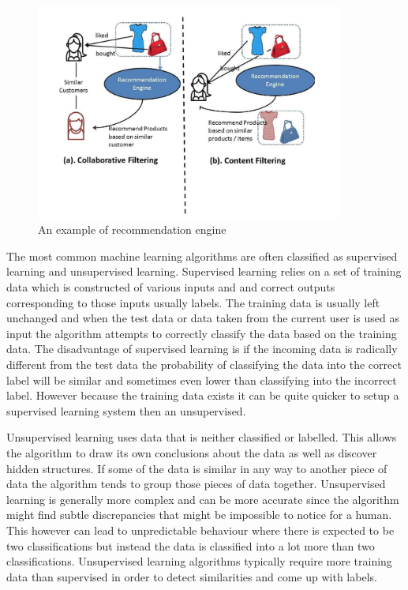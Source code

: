 \begin{figure}[ht]
  \centering
      \includegraphics[width=0.9\textwidth]{Figures/recommendationEngine.png}
  \caption[An example of recommendation engine]{An example of recommendation engine\cite{recommendation}}
  \label{fig:recommendation}
\end{figure}

The most common machine learning algorithms are often classified as supervised learning and unsupervised learning.
Supervised learning \cite{supervised} relies on a set of training data which is constructed of various inputs and and correct outputs corresponding to those inputs usually labels. The training data is usually left unchanged and when the test data or data taken from the current user is used as input the algorithm attempts to correctly classify the data based on the training data. The disadvantage of supervised learning is if the incoming data is radically different from the test data the probability of classifying the data into the correct label will be similar and sometimes even lower than classifying into the incorrect label. However because the training data exists it can be quite quicker to setup a supervised learning system then an unsupervised.

Unsupervised learning \cite{unsupervised} uses data that is neither classified or labelled. This allows the algorithm to draw its own conclusions about the data as well as discover hidden structures. If some of the data is similar in any way to another piece of data the algorithm tends to group those pieces of data together. Unsupervised learning is generally more complex and can be more accurate since the algorithm might find subtle discrepancies that might be impossible to notice for a human. This however can lead to unpredictable behaviour where there is expected to be two classifications but instead the data is classified into a lot more than two classifications. Unsupervised learning algorithms typically require more training data than supervised in order to detect similarities and come up with labels.

